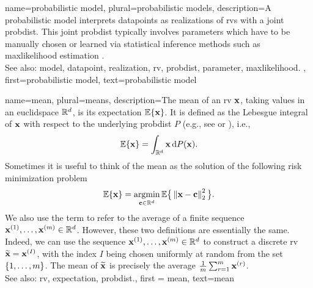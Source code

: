 {name={probabilistic model}, plural={probabilistic models},
	description={A probabilistic \gls{model} interprets \glspl{datapoint} 
		as \glspl{realization} of \glspl{rv} with a joint \gls{probdist}. This joint \gls{probdist} typically 
		involves \glspl{parameter} which have to be manually chosen or learned via statistical inference 
		methods such as \gls{maxlikelihood} estimation \cite{LC}.
					\\ 
		See also: \gls{model}, \gls{datapoint}, \gls{realization}, \gls{rv}, \gls{probdist}, \gls{parameter}, \gls{maxlikelihood}. }, 
	first={probabilistic model}, 
	text={probabilistic model} 
}


{name={mean}, plural={means},
 description={The  mean of an \gls{rv} ${\bf x}$, taking 
 	values in an \gls{euclidspace} $\mathbb{R}^{d}$, is its 
 	\gls{expectation} $\mathbb{E}\{{\bf x}\}$. It is defined as the Lebesgue 
 	integral of ${\bf x}$ with respect to the underlying \gls{probdist} $P$ (e.g., see \cite{RudinBookPrinciplesMatheAnalysis} or \cite{BillingsleyProbMeasure}), i.e.,
	\[
		\mathbb{E}\{{\bf x}\} = \int_{\mathbb{R}^{d}} {\bf x} \, \mathrm{d}P({\bf x}).
	\] 
	Sometimes it is useful to think of the mean as the solution of the following \gls{risk} 
	minimization problem \cite{BertsekasProb}
	\[
		\mathbb{E}\{{\bf x}\} = \operatorname*{argmin}_{{\bf c} \in \mathbb{R}^{d}} 
		\mathbb{E} \big\{\left\Vert {{\bf x}- {\bf c}} \right\Vert_{2}^{2}\big \}.
	\] 
	We also use the term to refer to the average of a finite sequence 
	${\bf x}^{(1)}, \ldots, {\bf x}^{(m)} \in \mathbb{R}^{d}$. However, 
	these two definitions are essentially the same. Indeed, we can use the sequence 
	${\bf x}^{(1)}, \ldots, {\bf x}^{(m)} \in \mathbb{R}^{d}$ to construct a 
	discrete \gls{rv} $\widetilde{{\bf x}}={\bf x}^{(I)}$, with the index $I$ being chosen uniformly 
	at random from the set $\{1,\ldots,m\}$. The mean of $\widetilde{{\bf x}}$ is 
	precisely the average $\frac{1}{m} \sum_{r=1}^{m} {\bf x}^{(r)}$.
			\\ 
		See also: \gls{rv}, \gls{expectation}, \gls{probdist}.}, 
		first = {mean}, text={mean} 
}

